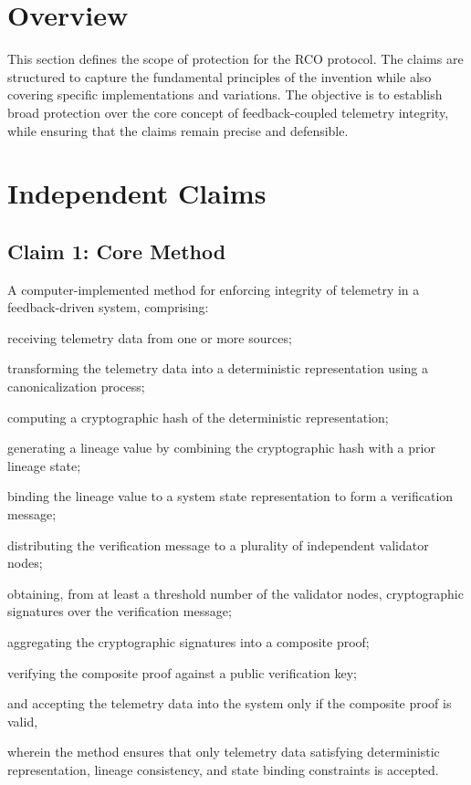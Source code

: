 \section{Overview}

This section defines the scope of protection for the RCO protocol. The claims are structured to capture the fundamental principles of the invention while also covering specific implementations and variations. The objective is to establish broad protection over the core concept of feedback-coupled telemetry integrity, while ensuring that the claims remain precise and defensible.

\section{Independent Claims}

\subsection{Claim 1: Core Method}

A computer-implemented method for enforcing integrity of telemetry in a feedback-driven system, comprising:

receiving telemetry data from one or more sources;

transforming the telemetry data into a deterministic representation using a canonicalization process;

computing a cryptographic hash of the deterministic representation;

generating a lineage value by combining the cryptographic hash with a prior lineage state;

binding the lineage value to a system state representation to form a verification message;

distributing the verification message to a plurality of independent validator nodes;

obtaining, from at least a threshold number of the validator nodes, cryptographic signatures over the verification message;

aggregating the cryptographic signatures into a composite proof;

verifying the composite proof against a public verification key;

and accepting the telemetry data into the system only if the composite proof is valid,

wherein the method ensures that only telemetry data satisfying deterministic representation, lineage consistency, and state binding constraints is accepted.

